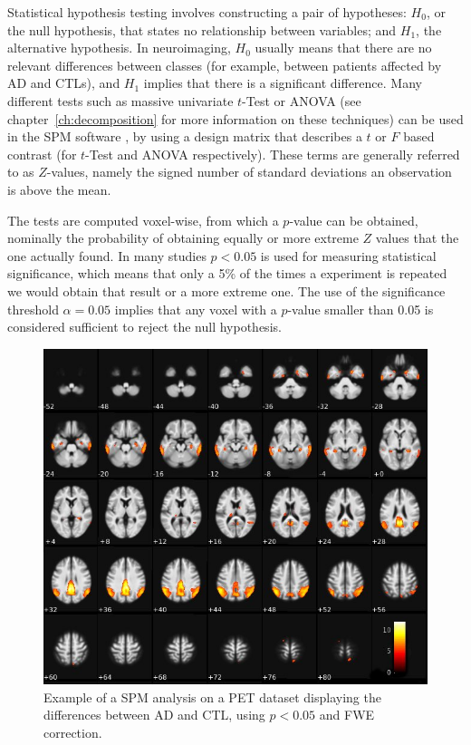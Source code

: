 Statistical hypothesis testing involves constructing a pair of hypotheses: $H_0$, or the null hypothesis, that states no relationship between variables; and $H_1$, the alternative hypothesis. In neuroimaging, $H_0$ usually means that there are no relevant differences between classes (for example, between patients affected by \ac{AD} and \acp{CTL}), and $H_1$ implies that there is a significant difference. Many different tests such as massive univariate $t$-Test or \ac{ANOVA} (see chapter~\ref{ch:decomposition} for more information on these techniques) can be used in the \ac{SPM} software \cite{spm_book}, by using a design matrix that describes a $t$ or $F$ based contrast (for $t$-Test and \ac{ANOVA} respectively). These terms are generally referred to as $Z$-values, namely the signed number of standard deviations an observation is above the mean. 

The tests are computed voxel-wise, from which a $p$-value can be obtained, nominally the probability of obtaining equally or more extreme $Z$ values that the one actually found. In many studies $p < 0.05$ is used for measuring statistical significance, which means that only a 5\% of the times a experiment is repeated we would obtain that result or a more extreme one. The use of the significance threshold $\alpha=0.05$ implies that any voxel with a $p$-value smaller than 0.05 is considered sufficient to reject the null hypothesis. 

\begin{figure}[htp]
	\centering
	\includegraphics[width=\linewidth]{Graphics/ch2/example_SPM}
	\caption[Example of a \acs{SPM} analysis on a \acs{PET} dataset.]{Example of a \ac{SPM} analysis on a \ac{PET} dataset displaying the differences between \ac{AD} and \ac{CTL}, using $p<0.05$ and \ac{FWE} correction.}
	\label{fig:example_SPM}
\end{figure}

